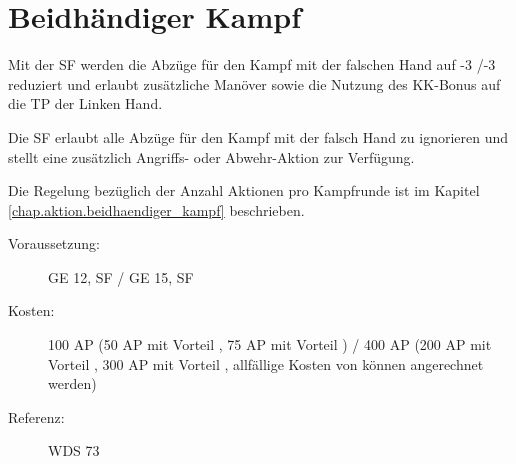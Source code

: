 \section{Beidhändiger Kampf}
\label{sf.beidhaendiger_kampf}
Mit der SF  werden die Abzüge für den Kampf mit der falschen Hand auf -3 /-3 reduziert und erlaubt zusätzliche Manöver sowie die Nutzung des KK-Bonus auf die TP der Linken Hand.

Die SF  erlaubt alle Abzüge für den Kampf mit der falsch Hand zu ignorieren und stellt eine zusätzlich Angriffs- oder Abwehr-Aktion zur Verfügung.

Die Regelung bezüglich der Anzahl Aktionen pro Kampfrunde ist im Kapitel \ref{chap.aktion.beidhaendiger_kampf} beschrieben.

\begin{description}
    \item[Voraussetzung:]
        GE 12, SF  / GE 15, SF 
    \item [Kosten:]
        100 AP (50 AP mit Vorteil , 75 AP mit Vorteil ) / 400 AP (200 AP mit Vorteil , 300 AP mit Vorteil , allfällige Kosten von  können angerechnet werden)
    \item [Referenz:]
        WDS 73
\end{description}
